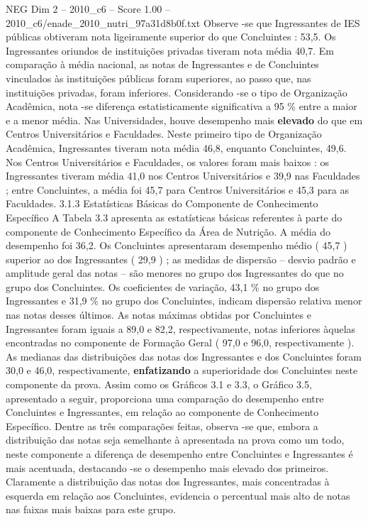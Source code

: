 \begin{textsample}{NEG Dim 2 – 2010\_c6 – Score 1.00 – 2010\_c6/enade\_2010\_nutri\_97a31d8b0f.txt}
Observe -se que Ingressantes de IES públicas obtiveram nota ligeiramente superior do que Concluintes : 53,5.
Os Ingressantes oriundos de instituições privadas tiveram nota média 40,7.
Em comparação à média nacional, as notas de Ingressantes e de Concluintes vinculados às instituições públicas foram superiores, ao passo que, nas instituições privadas, foram inferiores.
Considerando -se o tipo de Organização Acadêmica, nota -se diferença estatisticamente significativa a 95 \% entre a maior e a menor média.
Nas Universidades, houve desempenho mais \textbf{elevado} do que em Centros Universitários e Faculdades.
Neste primeiro tipo de Organização Acadêmica, Ingressantes tiveram nota média 46,8, enquanto Concluintes, 49,6.
Nos Centros Universitários e Faculdades, os valores foram mais baixos : os Ingressantes tiveram média 41,0 nos Centros Universitários e 39,9 nas Faculdades ; entre Concluintes, a média foi 45,7 para Centros Universitários e 45,3 para as Faculdades. 3.1.3 Estatísticas Básicas do Componente de Conhecimento Específico A Tabela 3.3 apresenta as estatísticas básicas referentes à parte do componente de Conhecimento Específico da Área de Nutrição.
A média do desempenho foi 36,2.
Os Concluintes apresentaram desempenho médio ( 45,7 ) superior ao dos Ingressantes ( 29,9 ) ; as medidas de dispersão – desvio padrão e amplitude geral das notas – são menores no grupo dos Ingressantes do que no grupo dos Concluintes.
Os coeficientes de variação, 43,1 \% no grupo dos Ingressantes e 31,9 \% no grupo dos Concluintes, indicam dispersão relativa menor nas notas desses últimos.
As notas máximas obtidas por Concluintes e Ingressantes foram iguais a 89,0 e 82,2, respectivamente, notas inferiores àquelas encontradas no componente de Formação Geral ( 97,0 e 96,0, respectivamente ).
As medianas das distribuições das notas dos Ingressantes e dos Concluintes foram 30,0 e 46,0, respectivamente, \textbf{enfatizando} a superioridade dos Concluintes neste componente da prova.
Assim como os Gráficos 3.1 e 3.3, o Gráfico 3.5, apresentado a seguir, proporciona uma comparação do desempenho entre Concluintes e Ingressantes, em relação ao componente de Conhecimento Específico.
Dentre as três comparações feitas, observa -se que, embora a distribuição das notas seja semelhante à apresentada na prova como um todo, neste componente a diferença de desempenho entre Concluintes e Ingressantes é mais acentuada, destacando -se o desempenho mais elevado dos primeiros.
Claramente a distribuição das notas dos Ingressantes, mais concentradas à esquerda em relação aos Concluintes, evidencia o percentual mais alto de notas nas faixas mais baixas para este grupo.

\end{textsample}
